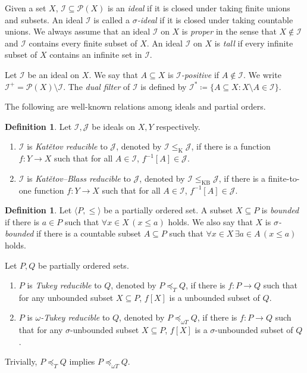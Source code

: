 \documentclass[a4paper,12pt]{amsart}
\theoremstyle{definition}
\newtheorem{dfn}[thm]{Definition}
\numberwithin{thm}{section}
\numberwithin{equation}{section}
\newcommand{\I}{\mathscr{I}}
\newcommand{\J}{\mathscr{J}}
\renewcommand{\subset}{\subseteq}
\begin{document}
    Given a set $X$, $\I\subset\mathcal{P}(X)$ is an \emph{ideal} if it is closed under taking finite unions and subsets. An ideal $\I$ is called a \emph{$\sigma$-ideal} if it is closed under taking countable unions. We always assume that an ideal $\I$ on $X$ is \emph{proper} in the sense that $X\notin\I$ and $\I$ contains every finite subset of $X$. An ideal $\I$ on $X$ is \emph{tall} if every infinite subset of $X$ contains an infinite set in $\I$.
    
    Let $\I$ be an ideal on $X$. We say that $A\subset X$ is \emph{$\I$-positive} if $A\notin \I$. We write $\I^+ = \mathcal{P}(X)\setminus\I$. The \emph{dual filter} of $\I$ is defined by $\I^* \coloneq \{A\subset X: X\setminus A\in\I\}$.
    
    The following are well-known relations among ideals and partial orders.
    
    \begin{dfn}
        Let $\I, \J$ be ideals on $X, Y$ respectively.
        \begin{enumerate}
            \item $\I$ is \emph{Kat\v{e}tov reducible} to $\J$, denoted by $\I\leq_\mathrm{K}\J$, if there is a function $f\colon Y\to X$ such that for all $A\in\I$, $f^{-1}[A]\in\J$.
            \item $\I$ is \emph{Kat\v{e}tov--Blass reducible} to $\J$, denoted by $\I\leq_{\mathrm{KB}}\J$, if there is a finite-to-one function $f\colon Y\to X$ such that for all $A\in\I$, $f^{-1}[A]\in\J$.
        \end{enumerate}
    \end{dfn}
    
    \begin{dfn}
        Let $\langle P, \leq\rangle$ be a partially ordered set. A subset $X\subset P$ is \emph{bounded} if there is $a\in P$ such that $\forall x\in X\,(x\leq a)$ holds. We also say that $X$ is \emph{$\sigma$-bounded} if there is a countable subset $A\subset P$ such that $\forall x\in X\, \exists a\in A\,(x\leq a)$ holds.
    
        Let $P, Q$ be partially ordered sets.
        \begin{enumerate}
            \item $P$ is \emph{Tukey reducible} to $Q$, denoted by $P\preceq_T Q$, if there is $f\colon P\to Q$ such that for any unbounded subset $X\subset P$, $f[X]$ is a unbounded subset of $Q$.
            \item $P$ is \emph{$\omega$-Tukey reducible} to $Q$, denoted by $P\preceq_{\omega T} Q$, if there is $f\colon P\to Q$ such that for any $\sigma$-unbounded subset $X\subset P$, $f[X]$ is a $\sigma$-unbounded subset of $Q$.
        \end{enumerate}
        Trivially, $P\preceq_T Q$ implies $P\preceq_{\omega T} Q$.
    \end{dfn}
    
\end{document}
